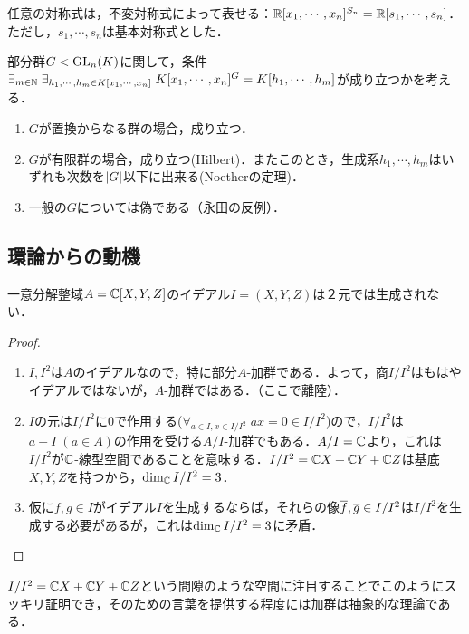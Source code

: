 \documentclass[uplatex,dvipdfmx]{jsreport}
\begin{document}
\begin{corollary}
    任意の対称式は，不変対称式によって表せる：$\mathbb{R}[x_1,\cdots,x_n]^{S_n}=\mathbb{R}[s_1,\cdots,s_n]$．ただし，$s_1,\cdots,s_n$は基本対称式とした．
\end{corollary}

\begin{theorem}[Hilbert 14]
    部分群$G<\mathrm{GL}_n(K)$に関して，条件
    $\exists_{m\in\mathbb{N}}\;\exists_{h_1,\cdots,h_m\in K[x_1,\cdots,x_n]}\;K[x_1,\cdots,x_n]^G=K[h_1,\cdots,h_m]$が成り立つかを考える．
    \begin{enumerate}
        \item $G$が置換からなる群の場合，成り立つ．
        \item $G$が有限群の場合，成り立つ(Hilbert)．またこのとき，生成系$h_1,\cdots,h_m$はいずれも次数を$\lvert G\rvert$以下に出来る(Noetherの定理)．
        \item 一般の$G$については偽である（永田の反例）．
    \end{enumerate}
\end{theorem}

\subsection{環論からの動機}

\begin{proposition}[イデアルの剰余が加群になる]
    一意分解整域$A=\mathbb{C}[X,Y,Z]$のイデアル$I=(X,Y,Z)$は２元では生成されない．
\end{proposition}
\begin{proof}\mbox{}
    \begin{enumerate}
        \item $I,I^2$は$A$のイデアルなので，特に部分$A$-加群である．よって，商$I/I^2$はもはやイデアルではないが，$A$-加群ではある．（ここで離陸）．
        \item $I$の元は$I/I^2$に$0$で作用する($\forall_{a\in I,x\in I/I^2}\;ax=0\in I/I^2$)ので，$I/I^2$は$a+I\;(a\in A)$の作用を受ける$A/I$-加群でもある．$A/I=\mathbb{C}$より，これは$I/I^2$が$\mathbb{C}$-線型空間であることを意味する．$I/I^2=\mathbb{C} X+\mathbb{C} Y+\mathbb{C} Z$は基底$X,Y,Z$を持つから，$\dim_{\mathbb{C}} I/I^2=3$．
        \item 仮に$f,g\in I$がイデアル$I$を生成するならば，それらの像$\overline{f},\overline{g}\in I/I^2$は$I/I^2$を生成する必要があるが，これは$\dim_{\mathbb{C}} I/I^2=3$に矛盾．
    \end{enumerate}
\end{proof}
\begin{remarks}
    $I/I^2=\mathbb{C} X+\mathbb{C} Y+\mathbb{C} Z$という間隙のような空間に注目することでこのようにスッキリ証明でき，そのための言葉を提供する程度には加群は抽象的な理論である．
\end{remarks}
\end{document}
